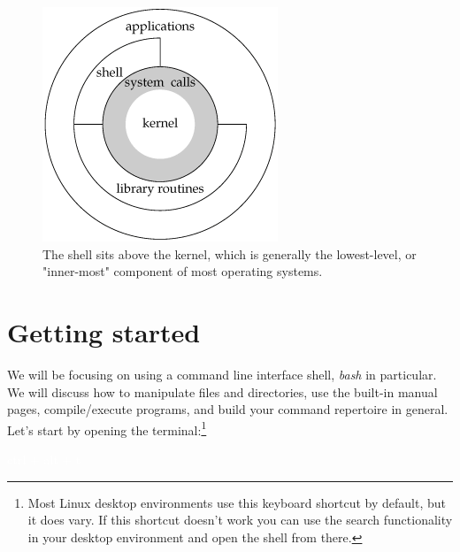 \documentclass[oneside]{book}
\newcommand{\commandline}[1]{\begin{center} \colorbox{Dark}{\textcolor{white}{#1}} \end{center}}
\begin{document}
\begin{figure}[H]
	\centering
	\includegraphics[scale=0.4]{kernel.png}
	\caption{The shell sits above the kernel, which is generally the lowest-level, or "inner-most" component of most operating systems.} 
\end{figure}

\section{Getting started}
We will be focusing on using a command line interface shell, \textit{bash} in particular. We will discuss how to manipulate files and directories, use the built-in manual pages, compile/execute programs, and build your command repertoire in general. Let's start by opening the terminal:\footnote{Most Linux desktop environments use this keyboard shortcut by default, but it does vary. If this shortcut doesn't work you can use the search functionality in your desktop environment and open the shell from there.}

\commandline{ctrl + alt + t}


\end{document}
